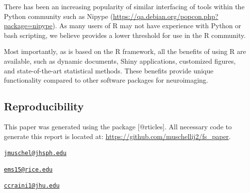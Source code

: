 There has been an increasing popularity of similar interfacing of tools
within the Python community such as Nipype
\citep{gorgolewski_nipype:_2011}
(\url{https://qa.debian.org/popcon.php?package=nipype}). As many users
of R may not have experience with Python or bash scripting, we believe
 provides a lower threshold for use in the R community.

Most importantly, as  is based on the R framework, all
the benefits of using R are available, such as dynamic documents, Shiny
applications, customized figures, and state-of-the-art statistical
methods. These benefits provide unique functionality compared to other
software packages for neuroimaging.

\subsection{Reproducibility}\label{reproducibility}

This paper was generated using the  package
{[}@rticles{]}. All necessary code to generate this report is located
at: \url{https://github.com/muschellij2/fs_paper}.



\address{%
John Muschelli\\
Johns Hopkins Bloomberg School of Public Health\\
Department of Biostatistics\\ 615 N Wolfe St, Baltimore, MD, 21205\\
}
\href{mailto:jmuschel@jhsph.edu}{\nolinkurl{jmuschel@jhsph.edu}}

\address{%
Elizabeth M. Sweeney\\
Rice University\\
Department of Statistics\\ 6100 Main St, Duncan Hall, Houston, TX, 77005\\
}
\href{mailto:ems15@rice.edu}{\nolinkurl{ems15@rice.edu}}

\address{%
Ciprian M. Crainiceanu\\
Johns Hopkins Bloomberg School of Public Health\\
Department of Biostatistics\\ 615 N Wolfe St, Baltimore, MD, 21205\\
}
\href{mailto:ccraini1@jhu.edu}{\nolinkurl{ccraini1@jhu.edu}}

